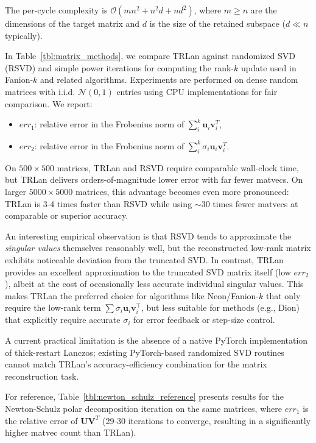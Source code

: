 \documentclass[smallextended,referee,envcountsect]{svjour3}
\def\vu{{\bm{u}}}
\def\vv{{\bm{v}}}
\def\mU{{\bm{U}}}
\def\mV{{\bm{V}}}
\newcommand{\tableref}[1]{Table~\ref{#1}}
\begin{document}
 The per-cycle complexity is $\mathcal{O}(mn^2 + n^2d + nd^2)$, where $m \geq n$ are the dimensions of the target matrix and $d$ is the size of the retained subspace ($d \ll n$ typically).
 
 In \tableref{tbl:matrix_methods}, we compare TRLan against randomized SVD (RSVD) and simple power iterations for computing the rank-$k$ update used in Fanion-$k$ and related algorithms. Experiments are performed on dense random matrices with i.i.d. $\mathcal{N}(0,1)$ entries using CPU implementations for fair comparison.
 We report:
 \begin{itemize}
   \item $err_1$: relative error in the Frobenius norm of $\sum_i^k \vu_i \vv_i^T$,
   \item $err_2$: relative error in the Frobenius norm of $\sum_i^k \sigma_i \vu_i \vv_i^T$.
 \end{itemize}
 
 On $500\times500$ matrices, TRLan and RSVD require comparable wall-clock time, but TRLan delivers orders-of-magnitude lower error with far fewer matvecs. On larger $5000\times5000$ matrices, this advantage becomes even more pronounced: TRLan is 3-4 times faster than RSVD while using $\sim$30 times fewer matvecs at comparable or superior accuracy.
 
 An interesting empirical observation is that RSVD tends to approximate the \emph{singular values} themselves reasonably well, but the reconstructed low-rank matrix exhibits noticeable deviation from the truncated SVD. In contrast, TRLan provides an excellent approximation to the truncated SVD matrix itself (low $err_2$), albeit at the cost of occasionally less accurate individual singular values. This makes TRLan the preferred choice for algorithms like Neon/Fanion-$k$ that only require the low-rank term $\sum \sigma_i \vu_i \vv_i^\top$, but less suitable for methods (e.g., Dion) that explicitly require accurate $\sigma_i$ for error feedback or step-size control.
 
 A current practical limitation is the absence of a native PyTorch implementation of thick-restart Lanczos; existing PyTorch-based randomized SVD routines cannot match TRLan's accuracy-efficiency combination for the matrix reconstruction task.
 
 For reference, \tableref{tbl:newton_schulz_reference} presents results for the Newton-Schulz polar decomposition iteration on the same matrices, where $err_1$ is the relative error of $\mU\mV^T$ (29-30 iterations to converge, resulting in a significantly higher matvec count than TRLan).
 
\end{document}
